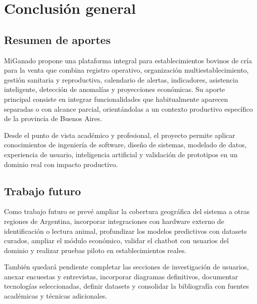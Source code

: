 \chapter{Conclusi\'on general}\label{chapter:conclusion}

\section{Resumen de aportes}

MiGanado propone una plataforma integral para establecimientos bovinos de cr\'ia para la venta que combina registro operativo, organizaci\'on multiestablecimiento, gesti\'on sanitaria y reproductiva, calendario de alertas, indicadores, asistencia inteligente, detecci\'on de anomal\'ias y proyecciones econ\'omicas. Su aporte principal consiste en integrar funcionalidades que habitualmente aparecen separadas o con alcance parcial, orient\'andolas a un contexto productivo espec\'ifico de la provincia de Buenos Aires.

Desde el punto de vista acad\'emico y profesional, el proyecto permite aplicar conocimientos de ingenier\'ia de software, dise\~no de sistemas, modelado de datos, experiencia de usuario, inteligencia artificial y validaci\'on de prototipos en un dominio real con impacto productivo.

\section{Trabajo futuro}

Como trabajo futuro se prev\'e ampliar la cobertura geogr\'afica del sistema a otras regiones de Argentina, incorporar integraciones con hardware externo de identificaci\'on o lectura animal, profundizar los modelos predictivos con datasets curados, ampliar el m\'odulo econ\'omico, validar el chatbot con usuarios del dominio y realizar pruebas piloto en establecimientos reales.

Tambi\'en quedar\'a pendiente completar las secciones de investigaci\'on de usuarios, anexar encuestas y entrevistas, incorporar diagramas definitivos, documentar tecnolog\'ias seleccionadas, definir datasets y consolidar la bibliograf\'ia con fuentes acad\'emicas y t\'ecnicas adicionales.

